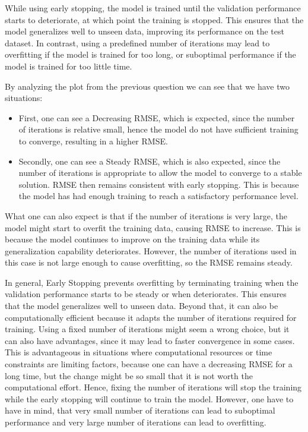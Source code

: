 \documentclass{article}
\begin{document}
While using early stopping, the model is trained until the validation performance starts to deteriorate, at which point the training is stopped. This ensures that the model generalizes well to unseen data, improving its performance on the test dataset. In contrast, using a predefined number of iterations may lead to overfitting if the model is trained for too long, or suboptimal performance if the model is trained for too little time.

By analyzing the plot from the previous question we can see that we have two situations:
\begin{itemize}
    \item First, one can see a Decreasing RMSE, which is expected, since the number of iterations is relative small, hence the model do not have sufficient training to converge, resulting in a higher RMSE.
    \item Secondly, one can see a Steady RMSE, which is also expected, since the number of iterations is appropriate to allow the model to converge to a stable solution. RMSE then remains consistent with early stopping. This is because the model has had enough training to reach a satisfactory performance level.
\end{itemize}

What one can also expect is that if the number of iterations is very large, the model might start to overfit the training data, causing RMSE to increase. This is because the model continues to improve on the training data while its generalization capability deteriorates. However, the number of iterations used in this case is not large enough to cause overfitting, so the RMSE remains steady.

In general, Early Stopping prevents overfitting by terminating training when the validation performance starts to be steady or when deteriorates. This ensures that the model generalizes well to unseen data. Beyond that, it can also be computationally efficient because it adapts the number of iterations required for training.
Using a fixed number of iterations might seem a wrong choice, but it can also have advantages, since it may lead to faster convergence in some cases. This is advantageous in situations where computational resources or time constraints are limiting factors, because one can have a decreasing RMSE for a long time, but the change might be so small that it is not worth the computational effort. Hence, fixing the number of iterations will stop the training while the early stopping will continue to train the model.
However, one have to have in mind, that very small number of iterations can lead to suboptimal performance and very large number of iterations can lead to overfitting.
\end{document}
